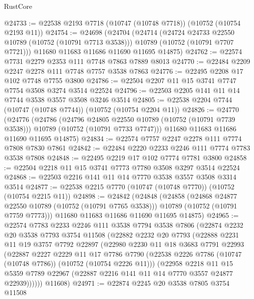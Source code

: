 \begin{lexlean}{RustCore}
\begin{coremodule}
@24733 := @22538 @2193 @7718 (@10747 (@10748 @7718)) (@10752 (@10754 @2193 @11))
@24754 := @24698
    (@24704
      (@24714
        (@24724 @24733 @22550 @10789 (@10752 (@10791 @7713 @3538)))
        @10789
        (@10752 (@10791 @7707 @7721)))
      @11680
      @11683
      @11686
      @11690
      @11695
      @14875)
@24762 := @22574 @7731 @2279 @2353 @111 @7748 @7863 @7889 @8013
@24770 := @22484 @2209 @2247 @2278 @111 @7748 @7757 @3538 @7863
@24776 := @22495 @2208 @17 @102 @7748 @7755 @3800
@24786 := @22504 @2207 @11 @15 @3741 @7747 @7754 @3508 @3274 @3514 @22524
@24796 := @22503 @2205 @141 @11 @14 @7744 @3538 @3557 @3508 @3246 @3514
@24805 := @22538 @2204 @7744 (@10747 (@10748 @7744)) (@10752 (@10754 @2204 @11))
@24826 := @24770
    (@24776
      (@24786
        (@24796 @24805 @22550 @10789 (@10752 (@10791 @7739 @3538)))
        @10789
        (@10752 (@10791 @7733 @7747)))
      @11680
      @11683
      @11686
      @11690
      @11695
      @14875)
@24834 := @22574 @7757 @2247 @2278 @111 @7774 @7808 @7830 @7861
@24842 := @22484 @2220 @2233 @2246 @111 @7774 @7783 @3538 @7808
@24848 := @22495 @2219 @17 @102 @7774 @7781 @3800
@24858 := @22504 @2218 @11 @15 @3741 @7773 @7780 @3508 @3297 @3514 @22524
@24868 := @22503 @2216 @141 @11 @14 @7770 @3538 @3557 @3508 @3314 @3514
@24877 := @22538 @2215 @7770 (@10747 (@10748 @7770)) (@10752 (@10754 @2215 @11))
@24898 := @24842
    (@24848
      (@24858
        (@24868 @24877 @22550 @10789 (@10752 (@10791 @7765 @3538)))
        @10789
        (@10752 (@10791 @7759 @7773)))
      @11680
      @11683
      @11686
      @11690
      @11695
      @14875)
@24965 := @22574
    @7783
    @2233
    @2246
    @111
    @3538
    @7794
    @3538
    @7806
    (@22874
      @2232
      @20
      @3538
      @7793
      @3754
      @11508
      (@22882
        @2232
        @20
        @7793
        (@22888
          @2231
          @11
          @19
          @3757
          @7792
          @22897
          (@22980
            @2230
            @11
            @18
            @3683
            @7791
            @22993
            (@22887
              @2227
              @2229
              @11
              @17
              @7786
              @7790
              (@22538 @2226 @7786 (@10747 (@10748 @7786)) (@10752 (@10754 @2226 @11)))
              (@22958
                @2218
                @11
                @15
                @5359
                @7789
                @22967
                (@22887 @2216 @141 @11 @14 @7770 @3557 @24877 @22939))))))
      @11608)
@24971 := @22874 @2245 @20 @3538 @7805 @3754 @11508

\end{coremodule}
\end{lexlean}
